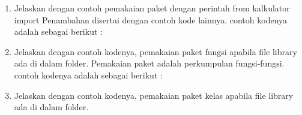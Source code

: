 \begin{enumerate}
    \item Jelaskan dengan contoh pemakaian paket dengan perintah from kalkulator import Penambahan disertai dengan contoh kode lainnya.
contoh kodenya adalah sebagai berikut :
 

    \item Jelaskan dengan contoh kodenya, pemakaian paket fungsi apabila file library ada di dalam folder.
 Pemakaian paket adalah perkumpulan fungsi-fungsi. contoh kodenya adalah sebagai berikut :
 

    \item Jelaskan dengan contoh kodenya, pemakaian paket kelas apabila file library ada di dalam folder.
 

\end{enumerate}

